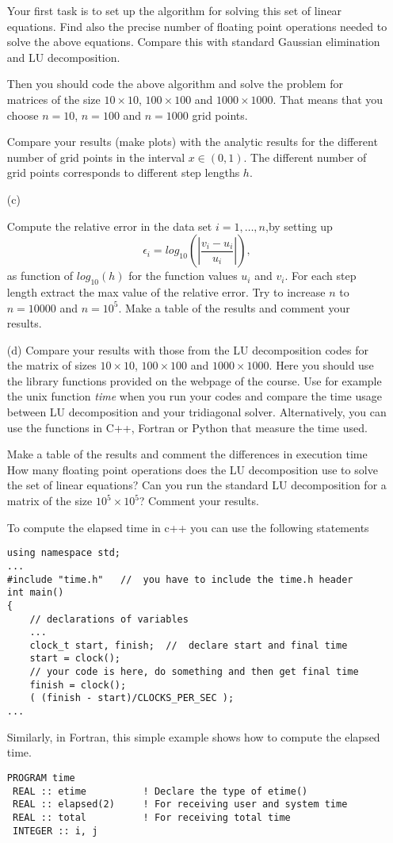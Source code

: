 \documentclass[11pt,a4wide]{article}
\begin{document}
\begin{enumerate}
Your first task is to set up the algorithm for solving this set of linear equations.
Find also the precise number of floating point 
operations needed to solve the above equations. 
Compare this with standard Gaussian elimination and LU decomposition.

Then you should code the above algorithm and solve the problem for matrices of the size
$10\times 10$, $100\times 100$ and $1000\times 1000$.  That means that you choose $n=10$, $n=100$ and
$n=1000$ grid points. 

Compare your results (make plots) with the analytic results for the different number of grid points  in the 
interval $x\in(0,1)$.  The different number of grid points corresponds to different step lengths $h$.

\item[(c)]

Compute the relative error  in the data set $i=1,\dots, n$,by setting up 
\[
   \epsilon_i=log_{10}\left(\left|\frac{v_i-u_i}
                 {u_i}\right|\right),
\]
as function of $log_{10}(h)$ for the function values $u_i$ and $v_i$.
For each step length extract the max value of the relative error.  
Try to increase $n$ to $n=10000$ and $n=10^5$.  Make a table of the results and 
comment your results. 

\item[(d)]
Compare your results with those from the LU decomposition codes for the matrix of sizes $10\times 10$, $100\times 100$ and
$1000\times 1000$. Here you should use the library functions provided  on the webpage of the course.
Use for example the unix function {\em time} when you run your codes 
and compare the time usage between LU decomposition and  your
tridiagonal solver.   Alternatively, you can use the functions in C++, Fortran or Python that measure the time used. 

Make a table of the results and comment the differences
in execution time
How many floating point operations does the LU decomposition use to solve the set of linear equations?
Can you run the standard LU decomposition
for a matrix of the size $10^5\times 10^5$?
Comment your results.


To compute the elapsed time in c++ you can use the following statements
\begin{lstlisting}[title={Time in C++}]
using namespace std;
...
#include "time.h"   //  you have to include the time.h header
int main()
{
    // declarations of variables 
    ...
    clock_t start, finish;  //  declare start and final time
    start = clock();
    // your code is here, do something and then get final time
    finish = clock();
    ( (finish - start)/CLOCKS_PER_SEC );
...
\end{lstlisting}
Similarly, in Fortran, this simple example shows how to compute the elapsed time.
\lstset{language=[90]Fortran}
\begin{lstlisting}[title={Time in Fortran}]
PROGRAM time
 REAL :: etime          ! Declare the type of etime()
 REAL :: elapsed(2)     ! For receiving user and system time
 REAL :: total          ! For receiving total time
 INTEGER :: i, j


\end{lstlisting}
\end{enumerate}
\end{document}
